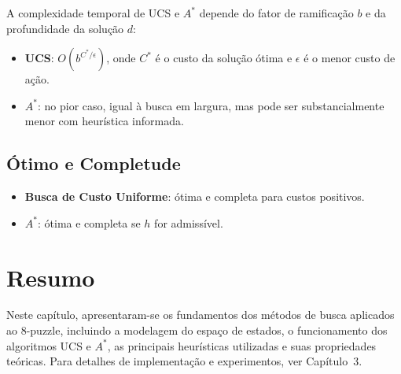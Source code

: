 A complexidade temporal de UCS e $A^*$ depende do fator de ramificação $b$ e da profundidade da solução $d$:  
\begin{itemize}  
    \item \textbf{UCS}: $O(b^{C^*/\epsilon})$, onde $C^*$ é o custo da solução ótima e $\epsilon$ é o menor custo de ação.  
    \item \textbf{$A^*$}: no pior caso, igual à busca em largura, mas pode ser substancialmente menor com heurística informada.  
\end{itemize}  
  
\subsection{Ótimo e Completude}  
  
\begin{itemize}  
    \item \textbf{Busca de Custo Uniforme}: ótima e completa para custos positivos.  
    \item \textbf{$A^*$}: ótima e completa se $h$ for admissível.  
\end{itemize}  
  
\section{Resumo}  
  
Neste capítulo, apresentaram-se os fundamentos dos métodos de busca aplicados ao 8-puzzle, incluindo a modelagem do espaço de estados, o funcionamento dos algoritmos UCS e $A^*$, as principais heurísticas utilizadas e suas propriedades teóricas. Para detalhes de implementação e experimentos, ver Capítulo~3.  
  